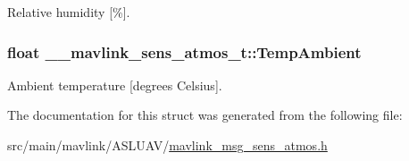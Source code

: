 Relative humidity \mbox{[}\%\mbox{]}. 

\hypertarget{struct____mavlink__sens__atmos__t_ad31aa3dfd9a3f4f27b16ff1abe11830d}{
\subsubsection[{Temp\+Ambient}]{\setlength{\rightskip}{0pt plus 5cm}float \+\_\+\+\_\+mavlink\+\_\+sens\+\_\+atmos\+\_\+t\+::\+Temp\+Ambient}}\label{struct____mavlink__sens__atmos__t_ad31aa3dfd9a3f4f27b16ff1abe11830d}


Ambient temperature \mbox{[}degrees Celsius\mbox{]}. 



The documentation for this struct was generated from the following file\+:\begin{DoxyCompactItemize}
\item 
src/main/mavlink/\+A\+S\+L\+U\+A\+V/\hyperlink{mavlink__msg__sens__atmos_8h}{mavlink\+\_\+msg\+\_\+sens\+\_\+atmos.\+h}\end{DoxyCompactItemize}
